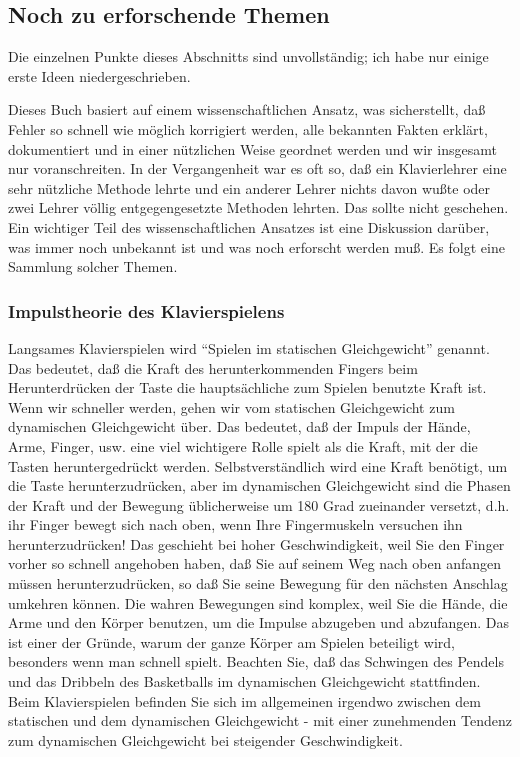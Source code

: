 
\subsection{Noch zu erforschende Themen}
\label{c1iv6}

Die einzelnen Punkte dieses Abschnitts sind unvollständig; ich habe nur einige erste Ideen niedergeschrieben.

Dieses Buch basiert auf einem wissenschaftlichen Ansatz, was sicherstellt, daß Fehler so schnell wie möglich korrigiert werden, alle bekannten Fakten erklärt, dokumentiert und in einer nützlichen Weise geordnet werden und wir insgesamt nur voranschreiten.
In der Vergangenheit war es oft so, daß ein Klavierlehrer eine sehr nützliche Methode lehrte und ein anderer Lehrer nichts davon wußte oder zwei Lehrer völlig entgegengesetzte Methoden lehrten.
Das sollte nicht geschehen.
Ein wichtiger Teil des wissenschaftlichen Ansatzes ist eine Diskussion darüber, was immer noch unbekannt ist und was noch erforscht werden muß.
Es folgt eine Sammlung solcher Themen.


\subsubsection{Impulstheorie des Klavierspielens}
\label{c1iv6a}

Langsames Klavierspielen wird \enquote{Spielen im statischen Gleichgewicht} genannt.
Das bedeutet, daß die Kraft des herunterkommenden Fingers beim Herunterdrücken der Taste die hauptsächliche zum Spielen benutzte Kraft ist.
Wenn wir schneller werden, gehen wir vom statischen Gleichgewicht zum dynamischen Gleichgewicht über.
Das bedeutet, daß der Impuls der Hände, Arme, Finger, usw. eine viel wichtigere Rolle spielt als die Kraft, mit der die Tasten heruntergedrückt werden.
Selbstverständlich wird eine Kraft benötigt, um die Taste herunterzudrücken, aber im dynamischen Gleichgewicht sind die Phasen der Kraft und der Bewegung üblicherweise um 180  Grad zueinander versetzt, d.h. ihr Finger bewegt sich nach oben, wenn Ihre Fingermuskeln versuchen ihn herunterzudrücken!
Das geschieht bei hoher Geschwindigkeit, weil Sie den Finger vorher so schnell angehoben haben, daß Sie auf seinem Weg nach oben anfangen müssen herunterzudrücken, so daß Sie seine Bewegung für den nächsten Anschlag umkehren können.
Die wahren Bewegungen sind komplex, weil Sie die Hände, die Arme und den Körper benutzen, um die Impulse abzugeben und abzufangen.
Das ist einer der Gründe, warum der ganze Körper am Spielen beteiligt wird, besonders wenn man schnell spielt.
Beachten Sie, daß das Schwingen des Pendels und das Dribbeln des Basketballs im dynamischen Gleichgewicht stattfinden.
Beim Klavierspielen befinden Sie sich im allgemeinen irgendwo zwischen dem statischen und dem dynamischen Gleichgewicht - mit einer zunehmenden Tendenz zum dynamischen Gleichgewicht bei steigender Geschwindigkeit.

